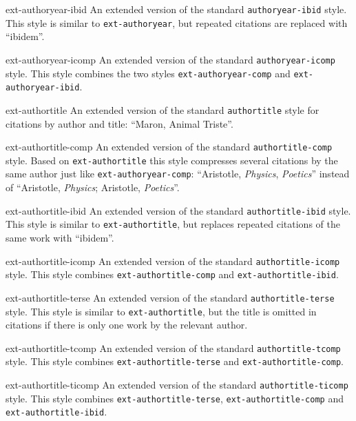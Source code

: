 \documentclass{ltxdockit}
\begin{document}
\begin{marglist}
\item[ext-authoryear-ibid]
An extended version of the standard \texttt{authoryear-ibid} style.
This style is similar to \texttt{ext-authoryear}, but repeated citations are
replaced with \enquote{ibidem}.

\item[ext-authoryear-icomp]
An extended version of the standard \texttt{authoryear-icomp} style.
This style combines the two styles \texttt{ext-authoryear-comp} and
\texttt{ext-authoryear-ibid}.

\item[ext-authortitle]
An extended version of the standard \texttt{authortitle} style for citations
by author and title: \enquote{Maron, Animal Triste}.

\item[ext-authortitle-comp]
An extended version of the standard \texttt{authortitle-comp} style.
Based on \texttt{ext-authortitle} this style compresses several citations
by the same author just like \texttt{ext-authoryear-comp}:
\enquote{Aristotle, \emph{Physics}, \emph{Poetics}} instead of
\enquote{Aristotle, \emph{Physics}; Aristotle, \emph{Poetics}}.

\item[ext-authortitle-ibid]
An extended version of the standard \texttt{authortitle-ibid} style.
This style is similar to \texttt{ext-authortitle}, but replaces repeated
citations of the same work with \enquote{ibidem}.

\item[ext-authortitle-icomp]
An extended version of the standard \texttt{authortitle-icomp} style.
This style combines \texttt{ext-authortitle-comp} and
\texttt{ext-authortitle-ibid}.

\item[ext-authortitle-terse]
An extended version of the standard \texttt{authortitle-terse} style.
This style is similar to \texttt{ext-authortitle}, but the title is omitted in
citations if there is only one work by the relevant author.

\item[ext-authortitle-tcomp]
An extended version of the standard \texttt{authortitle-tcomp} style.
This style combines \texttt{ext-authortitle-terse} and
\texttt{ext-authortitle-comp}.

\item[ext-authortitle-ticomp]
An extended version of the standard \texttt{authortitle-ticomp} style.
This style combines \texttt{ext-authortitle-terse},
\texttt{ext-authortitle-comp} and \texttt{ext-authortitle-ibid}.



\end{marglist}
\end{document}
